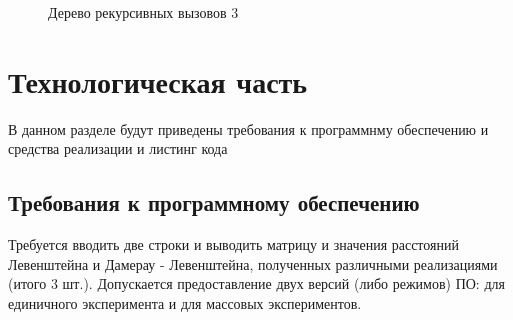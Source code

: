\documentclass[a4paper, 14pt]{article}
\begin{document}
\begin{figure}[pth!]
\caption{Дерево рекурсивных вызовов 3}
\label{ris:mpr2}
\end{figure}
	
	
	\newpage
	\section{Технологическая часть}
	В данном разделе будут приведены требования к программнму обеспечению и средства реализации и листинг кода
	\subsection{Требования к программному обеспечению}
	 Требуется вводить две строки и выводить матрицу и значения расстояний Левенштейна и Дамерау - Левенштейна, полученных различными реализациями (итого 3 шт.). Допускается предоставление двух версий (либо режимов) ПО: для единичного эксперимента и для массовых экспериментов.
\end{document}

